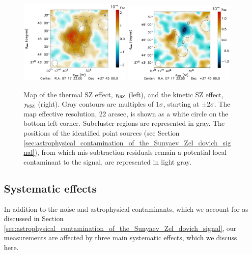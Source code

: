 \documentclass[twocolumn,traditabstract]{aa}
\begin{document}
\begin{figure}[h]
\centering
\includegraphics[width=0.49\textwidth]{Figure/MACSJ0717_tSZ_map.pdf}
\includegraphics[width=0.49\textwidth]{Figure/MACSJ0717_kSZ_map.pdf}
\caption{\footnotesize{Map of the thermal SZ effect, $y_{\rm tSZ}$ (left), and the kinetic SZ effect, $y_{\rm kSZ}$ (right). Gray contours are multiples of $1 \sigma$, starting at $\pm 2 \sigma$. The map effective resolution, 22 arcsec, is shown as a white circle on the bottom left corner. Subcluster regions are represented in gray. The positions of the identified point sources (see Section \ref{sec:astrophysical_contamination_of_the_Sunyaev_Zel_dovich_signal}), from which mis-subtraction residuals remain a potential local contaminant to the signal, are represented in light gray.}}
\label{fig:tSZ_kSZ_maps}
\end{figure}

\subsection{Systematic effects}
In addition to the noise and astrophysical contaminants, which we account for as discussed in Section \ref{sec:astrophysical_contamination_of_the_Sunyaev_Zel_dovich_signal}, our measurements are affected by three main systematic effects, which we discuss here.
\end{document}
